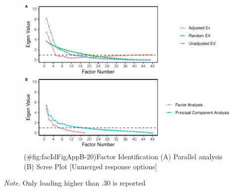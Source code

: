 \begin{appendix}
\begin{center}
\begin{ThreePartTable}
\end{ThreePartTable}
\end{center}

\begin{figure}
\centering
\includegraphics{manuscript_files/figure-latex/facIdFigAppB-20-1.pdf}
\caption{(\#fig:facIdFigAppB-20)Factor Identification (A) Parallel
analysis (B) Scree Plot {[}Unmerged response options{]}}
\end{figure}

\begin{center}
\begin{ThreePartTable}

\begin{TableNotes}[para]
\normalsize{\textit{Note.} Only loading higher than .30 is reported}
\end{TableNotes}


\end{ThreePartTable}
\end{center}
\end{appendix}
